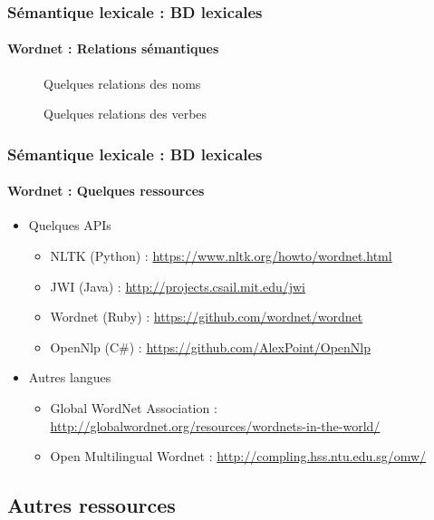 \documentclass[xcolor=table]{beamer}
\begin{document}
\begin{frame}
\frametitle{Sémantique lexicale : BD lexicales}
\framesubtitle{Wordnet : Relations sémantiques}

\vspace{-3pt}
\begin{figure}
	\vspace{-9pt}
	\caption{Quelques relations des noms \cite{2019-jurafsky-martin}}
\end{figure}\vspace{-6pt}

\begin{figure}
	\vspace{-9pt}
	\caption{Quelques relations des verbes \cite{2019-jurafsky-martin}}
\end{figure}
	
\end{frame}

\begin{frame}
\frametitle{Sémantique lexicale : BD lexicales}
\framesubtitle{Wordnet : Quelques ressources}
	
\begin{itemize}
	\item Quelques APIs
	\begin{itemize}
		\item NLTK (Python) : \url{https://www.nltk.org/howto/wordnet.html}
		\item JWI (Java) : \url{http://projects.csail.mit.edu/jwi}
		\item Wordnet (Ruby) : \url{https://github.com/wordnet/wordnet}
		\item OpenNlp (C\#) : \url{https://github.com/AlexPoint/OpenNlp}
	\end{itemize}
	\item Autres langues
	\begin{itemize}
		\item Global WordNet Association : \url{http://globalwordnet.org/resources/wordnets-in-the-world/}
		\item Open Multilingual Wordnet : \url{http://compling.hss.ntu.edu.sg/omw/}
	\end{itemize}
\end{itemize}
	
\end{frame}

\subsection{Autres ressources}
\end{document}
